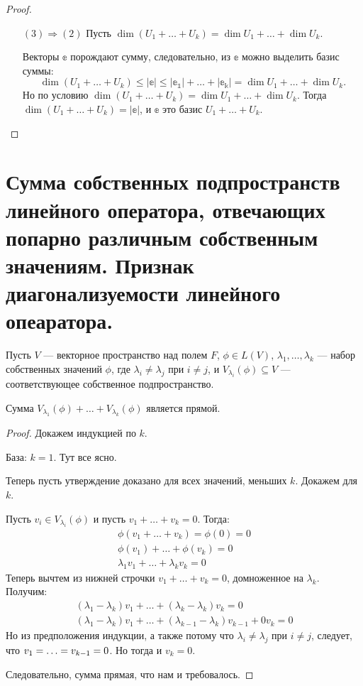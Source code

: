 \begin{proof}
\begin{itemize}
	\item[$(3) \Rightarrow (2)$] Пусть $\dim(U_1 + \ldots + U_k) = \dim{U_1} + \ldots + \dim{U_k}.$
	
	Векторы $\mathbb{e}$ порождают сумму, следовательно, из $\mathbb{e}$ можно выделить базис суммы:
	$$
	\dim(U_1 + \ldots + U_k) \leqslant |\mathbb{e}| \leqslant |\mathbb{e_1}|+ \ldots + |\mathbb{e_k}| = \dim{U_1} + \ldots + \dim{U_k}.
	$$
	Но по условию $\dim(U_1 + \ldots + U_k) = \dim{U_1} + \ldots + \dim{U_k}$. Тогда $\dim(U_1 + \ldots + U_k) = |\mathbb{e}|$, и $\mathbb{e}$ это базис $U_1 + \ldots + U_k$.
 \end{itemize}
 \end{proof}

\section{Сумма собственных подпространств линейного оператора, отвечающих попарно различным собственным значениям. Признак диагонализуемости линейного опеаратора.}

Пусть $V$ --- векторное пространство над полем $F$, $\phi \in L(V)$, $\lambda_1, \ldots, \lambda_k$ --- набор собственных значений $\phi$, где $\lambda_i \neq \lambda_j$ при $i \neq j$, и $V_{\lambda_i}(\phi) \subseteq V$ --- соответствующее собственное подпространство.

\begin{Suggestion}
Сумма $V_{\lambda_1}(\phi) + \ldots + V_{\lambda_k}(\phi)$ является прямой.
\end{Suggestion}

\begin{proof}
Докажем индукцией по $k$.

База: $k = 1$. Тут все ясно.

Теперь пусть утверждение доказано для всех значений, меньших $k$. Докажем для $k$.

Пусть $v_i \in V_{\lambda_i}(\phi)$ и пусть $v_1 + \ldots + v_k = 0$. Тогда:
\begin{gather*}
\phi(v_1 + \ldots + v_k) = \phi(0) = 0 \\
\phi(v_1) + \ldots + \phi(v_k) = 0 \\
\lambda_1v_1 + \ldots + \lambda_kv_k = 0
\end{gather*}
Теперь вычтем из нижней строчки $v_1 + \ldots + v_k = 0$, домноженное на $\lambda_k$. Получим:
\begin{gather*}
(\lambda_1 - \lambda_k)v_1 + \ldots + (\lambda_k -\lambda_k)v_k = 0 \\
(\lambda_1 - \lambda_k)v_1 + \ldots + (\lambda_{k-1} -\lambda_k)v_{k-1} + 0v_k= 0
\end{gather*}
Но из предположения индукции, а также потому что $\lambda_i \neq \lambda_j$ при $i \neq j$, следует, что $v_1 = \ldots \hm= v_{k-1} = 0$. Но тогда и $v_k = 0$. 

Следовательно, сумма прямая, что нам и требовалось.
\end{proof}

